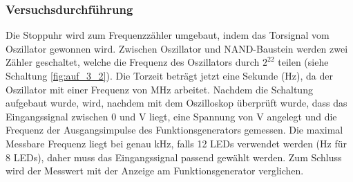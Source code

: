 \documentclass[12pt,a4paper]{article}
\begin{document}
\subsubsection*{Versuchsdurchführung}
Die Stoppuhr wird zum Frequenzzähler umgebaut, indem das Torsignal vom Oszillator gewonnen wird. Zwischen Oszillator und NAND-Baustein werden zwei Zähler geschaltet, welche die Frequenz des Oszillators durch $2^{22}$ teilen (siehe Schaltung \ref{fig:auf_3_2}). Die Torzeit beträgt jetzt eine Sekunde (\unit[0,5]{Hz}), da der Oszillator mit einer Frequenz von \unit[2,09715]{MHz} arbeitet. Nachdem die Schaltung aufgebaut wurde, wird, nachdem mit dem Oszilloskop überprüft wurde, dass das Eingangssignal zwischen 0 und \unit[5]{V} liegt, eine Spannung von \unit[5]{V} angelegt und die Frequenz der Ausgangsimpulse des Funktionsgenerators gemessen. Die maximal Messbare Frequenz liegt bei genau \unit[4,095]{kHz}, falls 12 LEDs verwendet werden (\unit[255]{Hz} für 8 LEDs), daher muss das Eingangssignal passend gewählt werden. Zum Schluss wird der Messwert mit der Anzeige am Funktionsgenerator verglichen.
\end{document}
